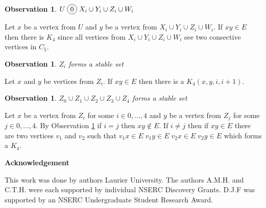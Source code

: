 \documentclass[12pt]{article}
\newcommand*\circled[1]{\tikz[baseline=(char.base)]{
            \node[shape=circle,draw,inner sep=2pt] (char) {#1};}}
\newtheorem{Observation}[Theorem]{Observation}
\begin{document}
\begin{Observation}\label{obs:U-co-joins}
$U \;\circled{0}\; X_i \cup Y_i \cup Z_i \cup W_i$
\end{Observation}
 Let $x$ be a vertex from $U$ and $y$ be a vertex from $X_i \cup Y_i \cup Z_i \cup W_i$. If $xy \in E$ then there is $K_4$ since all vertices from $X_i \cup Y_i \cup Z_i \cup W_i$ see two consective vertices in $C_5$.

\begin{Observation}\label{obs:Zi-stable}
$Z_i$ forms a stable set
\end{Observation}
 Let $x$ and $y$ be vertices from $Z_i$. If $xy \in E$ then there is a $K_4(x, y, i, i+1)$.

\begin{Observation}\label{obs:all-zi-stable}
$Z_0 \cup Z_1 \cup Z_2 \cup Z_3 \cup Z_4$ forms a stable set
\end{Observation}
 Let $x$ be a vertex from $Z_i$ for some $i \in {0,...,4}$ and $y$ be a vertex from $Z_j$ for some $j \in {0,...,4}$. By Observation \ref{obs:Zi-stable} if $i = j$ then $xy \not \in E$. If $i \neq j$ then if $xy \in E$ there are two vertices $v_1$ and $v_2$ such that $v_1x \in E\; v_1y \in E\; v_2x \in E\; v_2y \in E$ which forms a $K_4$.



\begin{center}
{\bf Acknowledgement}
\end{center}
This work was done by authors  Laurier University. The authors A.M.H. and C.T.H. were each supported by individual NSERC Discovery Grants. D.J.F was supported by an NSERC Undergraduate Student Research Award.


\clearpage
\begin{thebibliography}{99}

\end{thebibliography}
\end{document}
